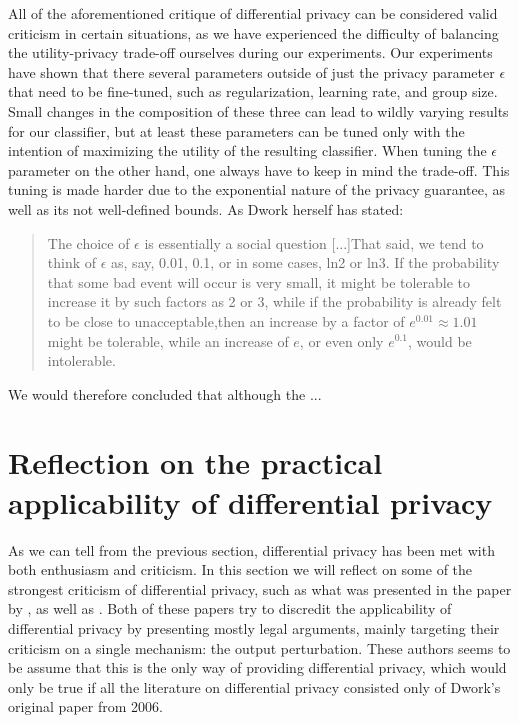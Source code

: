 All of the aforementioned critique of differential privacy can be considered valid criticism in certain situations, as we have experienced the difficulty of balancing the utility-privacy trade-off ourselves during our experiments. Our experiments have shown that there several parameters outside of just the privacy parameter $\epsilon$ that need to be fine-tuned, such as regularization, learning rate, and group size. Small changes in the composition of these three can lead to wildly varying results for our classifier, but at least these parameters can be tuned only with the intention of maximizing the utility of the resulting classifier. When tuning the $\epsilon$ parameter on the other hand, one always have to keep in mind the trade-off. This tuning is made harder due to the exponential nature of the privacy guarantee, as well as its not well-defined bounds. As Dwork herself has stated\citep{dwork2008differential}: 
\begin{quote}
	The choice of $\epsilon$ is essentially a social question [...]That said, we tend to think of $\epsilon$ as, say, 0.01, 0.1, or in some cases, ln2 or ln3. If the probability that some bad event will occur is very small, it 	might be tolerable to increase it by such factors as 2 or 3, while if the probability is already felt to be close to unacceptable,then an increase by a factor of $e^{0.01} ≈ 1.01$ might be tolerable, 	while an increase of $e$, or even only $e^{0.1}$, would be intolerable.
\end{quote}

 We would therefore concluded that although the ... 

\section{Reflection on the practical applicability of differential privacy}
As we can tell from the previous section, differential privacy has been met with both enthusiasm and criticism. In this section we will reflect on some of the strongest criticism of differential privacy, such as what was presented in the paper by \cite{Sarathy2011evaluating}, as well as \cite{ohm2010brokenPrivacyPromise}. Both of these papers try to discredit the applicability of differential privacy by presenting mostly legal arguments, mainly targeting their criticism on a single mechanism: the output perturbation. These authors seems to be assume that this is the only way of providing differential privacy, which would only be true if all the literature on differential privacy consisted only of Dwork's original paper from 2006. 

